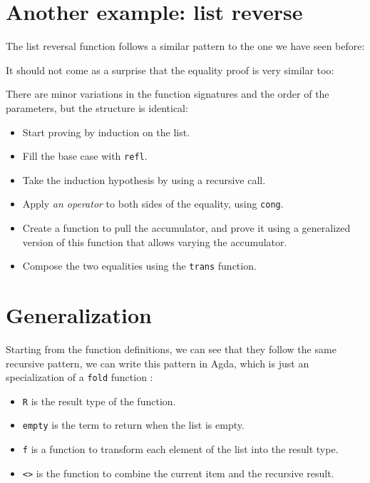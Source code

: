 \documentclass[runningheads]{llncs}
\begin{document}


\section{Another example: list reverse}

The list reversal function follows a similar pattern to the one we have seen before:



It should not come as a surprise that the equality proof is very similar too:



There are minor variations in the function signatures and the order of the parameters,
but the structure is identical:

\begin{itemize}
  \item Start proving by induction on the list.
  \item Fill the base case with \lstinline{refl}.
  \item Take the induction hypothesis by using a recursive call.
  \item Apply \emph{an operator} to both sides of the equality, using \lstinline{cong}.
  \item Create a function to pull the accumulator, and prove it using a generalized
        version of this function that allows varying the accumulator.
  \item Compose the two equalities using the \lstinline{trans} function.
\end{itemize}

\section{Generalization}

Starting from the function definitions, we can see that they follow the same recursive
pattern, we can write this pattern in Agda, which is just an specialization of a
\lstinline{fold} function \cite{hutton1999tutorial,meijer1991functional}:



\begin{itemize}
  \item \lstinline{R} is the result type of the function.
  \item \lstinline{empty} is the term to return when the list is empty.
  \item \lstinline{f} is a function to transform each element of the list into the result
        type.
  \item \lstinline{<>} is the function to combine the current item and the recursive
        result.
\end{itemize}
\end{document}
